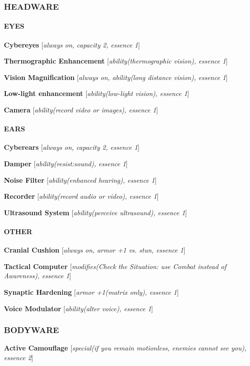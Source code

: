 \documentclass[oneside,10pt]{article}
\begin{document}
\begin{multicols}{2}
  \subsubsection{HEADWARE}
  
  \paragraph{EYES}

  \textbf{Cybereyes} [\textit{always on, capacity 2, essence 1}]

  \textbf{Thermographic Enhancement} [\textit{ability(thermographic
    vision), essence 1}]

  \textbf{Vision Magnification} [\textit{always on, ability(long
    distance vision), essence 1}]

  \textbf{Low-light enhancement} [\textit{ability(low-light vision),
    essence 1}]

  \textbf{Camera} [\textit{ability(record video or images), essence
    1}]

  \paragraph{EARS}
  \textbf{Cyberears} [\textit{always on, capacity 2, essence 1}]

  \textbf{Damper} [\textit{ability(resist:sound), essence 1}]

  \textbf{Noise Filter} [\textit{ability(enhanced hearing), essence
    1}]

  \textbf{Recorder} [\textit{ability(record audio or video), essence
    1}]

  \textbf{Ultrasound System} [\textit{ability(perceive ultrasound),
    essence 1}]

  \paragraph{OTHER}
  \textbf{Cranial Cushion} [\textit{always on, armor +1 vs. stun,
    essence 1}]

  \textbf{Tactical Computer} [\textit{modifies(Check the Situation:
    use Combat instead of Awareness), essence 1}]

  \textbf{Synaptic Hardening} [\textit{armor +1(matrix only), essence
    1}]

  \textbf{Voice Modulator} [\textit{ability(alter voice), essence 1}]


  \subsubsection{BODYWARE}
  \textbf{Active Camouflage} [\textit{special(if you remain
    motionless, enemies cannot see you), essence 2}]


\end{multicols}
\end{document}
